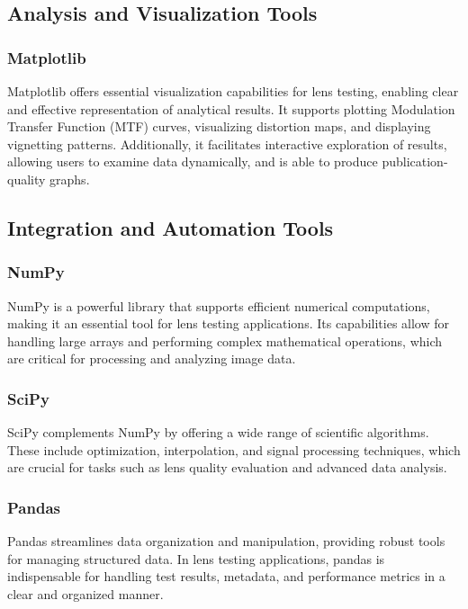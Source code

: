 \subsection{Analysis and Visualization Tools}

\subsubsection{Matplotlib}  
Matplotlib offers essential visualization capabilities for lens testing, enabling clear and effective representation of analytical results. It supports plotting Modulation Transfer Function (MTF) curves, visualizing distortion maps, and displaying vignetting patterns. Additionally, it facilitates interactive exploration of results, allowing users to examine data dynamically, and is able to produce publication-quality graphs.

\subsection{Integration and Automation Tools}

\subsubsection{NumPy}  
NumPy is a powerful library that supports efficient numerical computations, making it an essential tool for lens testing applications. Its capabilities allow for handling large arrays and performing complex mathematical operations, which are critical for processing and analyzing image data.

\subsubsection{SciPy}  
SciPy complements NumPy by offering a wide range of scientific algorithms. These include optimization, interpolation, and signal processing techniques, which are crucial for tasks such as lens quality evaluation and advanced data analysis.

\subsubsection{Pandas}  
Pandas streamlines data organization and manipulation, providing robust tools for managing structured data. In lens testing applications, pandas is indispensable for handling test results, metadata, and performance metrics in a clear and organized manner.

